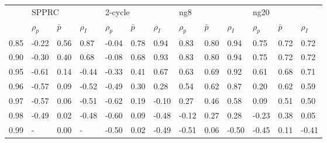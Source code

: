 \begin{tabular}{lllllllllllll}
\toprule
{} & \multicolumn{3}{l}{SPPRC} & \multicolumn{3}{l}{2-cycle} & \multicolumn{3}{l}{ng8} & \multicolumn{3}{l}{ng20} \\
{} & $\rho_p$ & $\bar p$ & $\rho_I$ & $\rho_p$ & $\bar p$ & $\rho_I$ & $\rho_p$ & $\bar p$ & $\rho_I$ & $\rho_p$ & $\bar p$ & $\rho_I$ \\
\midrule
0.85 &    -0.22 &     0.56 &     0.87 &    -0.04 &     0.78 &     0.94 &     0.83 &     0.80 &     0.94 &     0.75 &     0.72 &     0.72 \\
0.90 &    -0.30 &     0.40 &     0.68 &    -0.08 &     0.68 &     0.93 &     0.83 &     0.80 &     0.94 &     0.75 &     0.72 &     0.72 \\
0.95 &    -0.61 &     0.14 &    -0.44 &    -0.33 &     0.41 &     0.67 &     0.63 &     0.69 &     0.92 &     0.61 &     0.68 &     0.71 \\
0.96 &    -0.57 &     0.09 &    -0.52 &    -0.49 &     0.30 &     0.28 &     0.54 &     0.62 &     0.87 &     0.20 &     0.62 &     0.59 \\
0.97 &    -0.57 &     0.06 &    -0.51 &    -0.62 &     0.19 &    -0.10 &     0.27 &     0.46 &     0.58 &     0.09 &     0.51 &     0.50 \\
0.98 &    -0.49 &     0.02 &    -0.48 &    -0.60 &     0.09 &    -0.48 &    -0.12 &     0.27 &     0.28 &    -0.23 &     0.38 &     0.05 \\
0.99 &        - &     0.00 &        - &    -0.50 &     0.02 &    -0.49 &    -0.51 &     0.06 &    -0.50 &    -0.45 &     0.11 &    -0.41 \\
\bottomrule
\end{tabular}
